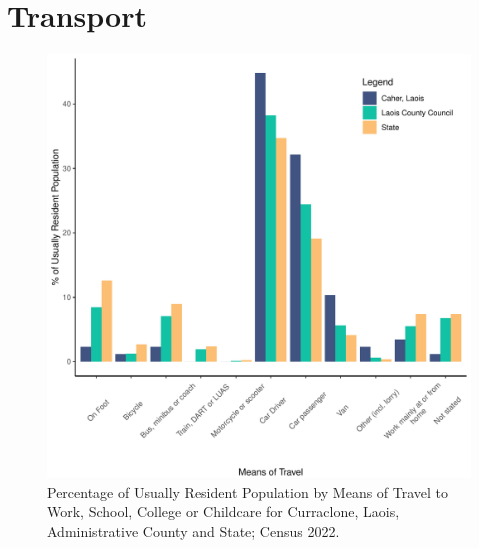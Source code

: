 \documentclass{article}
\begin{document}
\section{Transport}\label{sect:Trans}
\begin{figure}[H]
	\centering
	\includegraphics[width = 120mm]{../figures/TravelED.pdf}
	\caption{Percentage of Usually Resident Population by Means of Travel to Work, School, College or Childcare for Curraclone, Laois, Administrative County and State; Census 2022.}
	\label{fig:vbnv}
	\end{figure}
\end{document}
